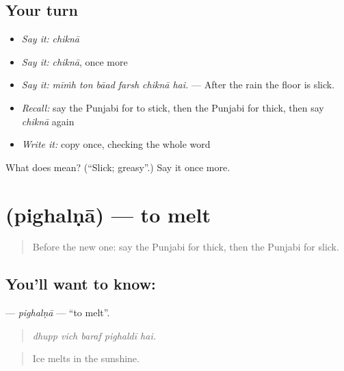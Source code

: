 \subsection*{Your turn}
\begin{itemize}
\raggedright
  \item \emph{Say it:} \emph{chiknā}
  \item \emph{Say it:} \emph{chiknā}, once more
  \item \emph{Say it:} \emph{mīṁh ton bāad farsh chiknā hai.} — After the rain the floor is slick.
  \item \emph{Recall:} say the Punjabi for to stick, then the Punjabi for thick, then say \emph{chiknā} again
  \item \emph{Write it:} copy \textbf{} once, checking the whole word
\end{itemize}

\begin{tcolorbox}[breakable,colback=teal!4,colframe=teal!35!black,title={Before you move on}]
What does  mean? (\textquotedblleft{}Slick; greasy\textquotedblright{}.) Say it once more.
\end{tcolorbox}
\section[\texorpdfstring{\pa{ਪਿਘਲਣਾ} (pighalṇā)}{ਪਿਘਲਣਾ (pighalṇā)}]{ (pighalṇā) — to melt}

\label{lesson:PA-C296-pighalna}



\begin{quote}
Before the new one: say the Punjabi for thick, then the Punjabi for slick.
\end{quote}

\subsection*{You'll want to know: }
\textbf{} — \emph{pighalṇā} — \textquotedblleft{}to melt\textquotedblright{}.

\begin{quote}
    
\end{quote}

\begin{quote}
\emph{dhupp vich baraf pighaldī hai.}
\end{quote}

\begin{quote}
Ice melts in the sunshine.
\end{quote}

